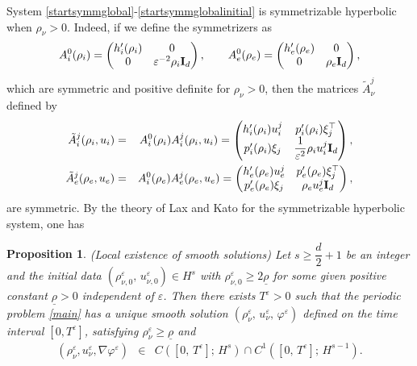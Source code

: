 \documentclass[reqno,twoside,12pt,a4paper]{amsart}
\newcommand{\eps}{\mathbb{\varepsilon}}
\newcommand{\D}{\nabla}
\newcommand{\vp}{\varphi}
\newtheorem{proposition}{Proposition}[section]
\numberwithin{equation}{section}
\begin{document}
System \eqref{startsymmglobal}-\eqref{startsymmglobalinitial} is symmetrizable hyperbolic when $\rho_\nu>0$. Indeed, if we define the symmetrizers as
\begin{eqnarray*}
A_i^0(\rho_i)=\left(\begin{matrix}
                  h_i^\prime(\rho_i)&0 \\
                   0 & \eps^{-2} \rho_i \mbox{\bf I}_d\\
                   \end{matrix}\right),\qquad
A_e^0(\rho_e)=\left(\begin{matrix}
                  h_e^\prime(\rho_e)&0 \\
                   0 &  \rho_e \mbox {\bf I}_d\\
                   \end{matrix}\right),
\end{eqnarray*}
which are symmetric and positive definite for $\rho_\nu>0$, then the matrices $\tilde{A}_\nu^j$  defined by
\begin{eqnarray*}
\tilde{A}_i^j(\rho_i, u_i)&=&A_i^0(\rho_i) A_i^j(\rho_i, u_i) =\left(\begin{matrix}
 h_i^\prime(\rho_i)u_i^j &  p_i^\prime(\rho_i) \xi_j^\top\\
 p_i^\prime(\rho_i) \xi_j& \dfrac{1}{\eps^2}\rho_i u_i^j \mbox {\bf I}_d\\
\end{matrix}
\right),\\
\tilde{A}_e^j(\rho_e, u_e)&=&A_i^0(\rho_e) A_e^j(\rho_e, u_e) =\left(\begin{matrix}
 h_e^\prime(\rho_e)u_e^j &  p_e^\prime(\rho_e) \xi_j^\top\\
 p_e^\prime(\rho_e) \xi_j&  \rho_e u_e^j \mbox {\bf I}_d
\end{matrix}\right),
\end{eqnarray*}
 are symmetric. By the theory of Lax \cite{Lax1973} and Kato \cite{Kato1975} for the symmetrizable hyperbolic system, one has
\begin{proposition}\label{localexistence}(Local existence of smooth solutions)
Let  $ s \geq \dfrac{d}{2}+1$  be an integer and the initial data $ \left(\rho_{\nu,0}^\eps,\,u_{\nu,0}^\eps\right)\in H^s $  with  $ \rho_{\nu,0}^\eps \geq 2\underline{\rho} $  for some given positive constant  $ \underline{\rho}>0$ independent of  $ \eps $. 
Then there exists  $ T^\eps>0 $  such that the periodic problem \eqref{main} has a unique smooth solution  $ \left(\rho^\eps_\nu,\,u^\eps_\nu,\,\vp^\eps \right) $  defined on the time interval $ [0,T^\eps] $, satisfying  $ \rho_\nu^\eps \geq \underline{\rho} $  and
\begin{eqnarray*}
\left(\rho_\nu^\eps, u_\nu^\eps, \D\vp^\eps\right)&\in &C\left(\left[0,\,T^\eps\right];\,H^s\right)\cap C^1\left(\left[0,\,T^\eps\right];\,H^{s-1}\right).
\end{eqnarray*}
\end{proposition}
\end{document}
